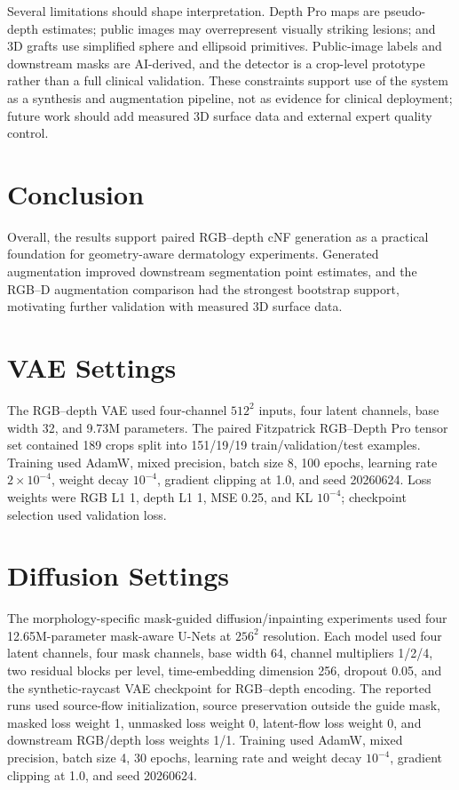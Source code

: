 \documentclass[runningheads]{llncs}
\begin{document}
Several limitations should shape interpretation. Depth Pro maps are pseudo-depth estimates; public images may overrepresent visually striking lesions; and 3D grafts use simplified sphere and ellipsoid primitives. Public-image labels and downstream masks are AI-derived, and the detector is a crop-level prototype rather than a full clinical validation. These constraints support use of the system as a synthesis and augmentation pipeline, not as evidence for clinical deployment; future work should add measured 3D surface data and external expert quality control.

\section{Conclusion}

Overall, the results support paired RGB--depth cNF generation as a practical foundation for geometry-aware dermatology experiments. Generated augmentation improved downstream segmentation point estimates, and the RGB--D augmentation comparison had the strongest bootstrap support, motivating further validation with measured 3D surface data.




\appendix
\section{VAE Settings}
The RGB--depth VAE used four-channel $512^2$ inputs, four latent channels, base width 32, and 9.73M parameters. The paired Fitzpatrick RGB--Depth Pro tensor set contained 189 crops split into 151/19/19 train/validation/test examples. Training used AdamW, mixed precision, batch size 8, 100 epochs, learning rate $2\times10^{-4}$, weight decay $10^{-4}$, gradient clipping at 1.0, and seed 20260624. Loss weights were RGB L1 1, depth L1 1, MSE 0.25, and KL $10^{-4}$; checkpoint selection used validation loss.

\section{Diffusion Settings}
The morphology-specific mask-guided diffusion/inpainting experiments used four 12.65M-parameter mask-aware U-Nets at $256^2$ resolution. Each model used four latent channels, four mask channels, base width 64, channel multipliers 1/2/4, two residual blocks per level, time-embedding dimension 256, dropout 0.05, and the synthetic-raycast VAE checkpoint for RGB--depth encoding. The reported runs used source-flow initialization, source preservation outside the guide mask, masked loss weight 1, unmasked loss weight 0, latent-flow loss weight 0, and downstream RGB/depth loss weights 1/1. Training used AdamW, mixed precision, batch size 4, 30 epochs, learning rate and weight decay $10^{-4}$, gradient clipping at 1.0, and seed 20260624.
\end{document}
